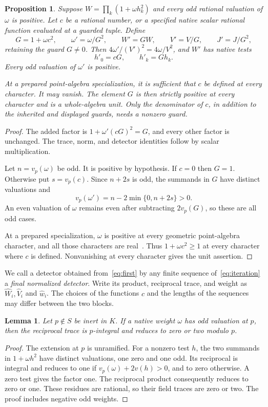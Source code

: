 \documentclass[11pt,a4paper]{article}
\newtheorem{lemma}[theorem]{Lemma}
\newtheorem{proposition}[theorem]{Proposition}
\begin{document}
\begin{proposition}\label{prop:iteration}
Suppose $W=\prod_k(1+\omega h_k^2)$ and every odd rational valuation
of $\omega$ is positive. Let $c$ be a rational number, or a specified
native scalar rational function evaluated at a guarded tuple. Define
\begin{equation}\label{eq:iteration}
 G=1+\omega c^2,\qquad
 \omega'=\omega/G^2,\qquad W'=GW,\qquad
 V'=V/G,\qquad J'=J/G^2,
\end{equation}
retaining the guard $G\ne0$. Then $4\omega'/(V')^2=4\omega/V^2$,
and $W'$ has native tests
\[
                         h'_0=cG,\qquad h'_k=Gh_k.
\]
Every odd valuation of $\omega'$ is positive.

At a prepared point-algebra specialization, it is sufficient that
$c$ be defined at every character. It may vanish. The element $G$
is then strictly positive at every character and is a whole-algebra
unit. Only the denominator of $c$, in addition to the inherited
and displayed guards, needs a nonzero guard.
\end{proposition}
\begin{proof}
The added factor is $1+\omega'(cG)^2=G$, and every other factor
is unchanged. The trace, norm, and detector identities follow by
scalar multiplication.

Let $n=v_p(\omega)$ be odd. It is positive by hypothesis. If $c=0$
then $G=1$. Otherwise put $s=v_p(c)$. Since $n+2s$ is odd, the
summands in $G$ have distinct valuations and
\[
 v_p(\omega')=n-2\min\{0,n+2s\}>0.
\]
An even valuation of $\omega$ remains even after subtracting
$2v_p(G)$, so these are all odd cases.

At a prepared specialization, $\omega$ is positive at every geometric
point-algebra character, and all those characters are real~\cite{Adaptive}.
Thus $1+\omega c^2\ge1$ at every character where $c$ is defined.
Nonvanishing at every character gives the unit assertion.
\end{proof}

We call a detector obtained from~\eqref{eq:first} by any finite sequence
of~\eqref{eq:iteration} a \emph{final normalized detector}. Write its
product, reciprocal trace, and weight as $\widehat W_i,\widehat V_i$
and $\widehat w_i$. The choices of the functions $c$ and the lengths
of the sequences may differ between the two blocks.

\begin{lemma}\label{lem:inert}
Let $p\notin S$ be inert in $K$. If a native weight $\omega$ has
odd valuation at $p$, then the reciprocal trace is $p$-integral and
reduces to zero or two modulo $p$.
\end{lemma}
\begin{proof}
The extension at $p$ is unramified. For a nonzero test $h$, the two
summands in $1+\omega h^2$ have distinct valuations, one zero and
one odd. Its reciprocal is integral and reduces to one if
$v_p(\omega)+2v(h)>0$, and to zero otherwise. A zero test gives
the factor one. The reciprocal product consequently reduces to
zero or one. These residues are rational, so their field traces
are zero or two. The proof includes negative odd weights.
\end{proof}
\end{document}
